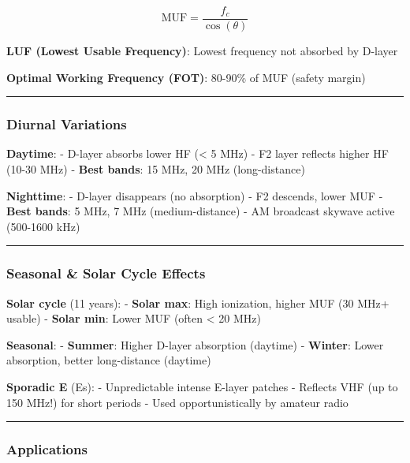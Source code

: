 \[
\text{MUF} = \frac{f_c}{\cos(\theta)}
\]

\textbf{LUF (Lowest Usable Frequency)}: Lowest frequency not absorbed by
D-layer

\textbf{Optimal Working Frequency (FOT)}: 80-90\% of MUF (safety margin)

\begin{center}\rule{0.5\linewidth}{0.5pt}\end{center}

\subsubsection{Diurnal Variations}\label{diurnal-variations}

\textbf{Daytime}: - D-layer absorbs lower HF (\textless{} 5 MHz) - F2
layer reflects higher HF (10-30 MHz) - \textbf{Best bands}: 15 MHz, 20
MHz (long-distance)

\textbf{Nighttime}: - D-layer disappears (no absorption) - F2 descends,
lower MUF - \textbf{Best bands}: 5 MHz, 7 MHz (medium-distance) - AM
broadcast skywave active (500-1600 kHz)

\begin{center}\rule{0.5\linewidth}{0.5pt}\end{center}

\subsubsection{Seasonal \& Solar Cycle
Effects}\label{seasonal-solar-cycle-effects}

\textbf{Solar cycle} (11 years): - \textbf{Solar max}: High ionization,
higher MUF (30 MHz+ usable) - \textbf{Solar min}: Lower MUF (often
\textless{} 20 MHz)

\textbf{Seasonal}: - \textbf{Summer}: Higher D-layer absorption
(daytime) - \textbf{Winter}: Lower absorption, better long-distance
(daytime)

\textbf{Sporadic E} (Es): - Unpredictable intense E-layer patches -
Reflects VHF (up to 150 MHz!) for short periods - Used opportunistically
by amateur radio

\begin{center}\rule{0.5\linewidth}{0.5pt}\end{center}

\subsubsection{Applications}\label{applications-1}

